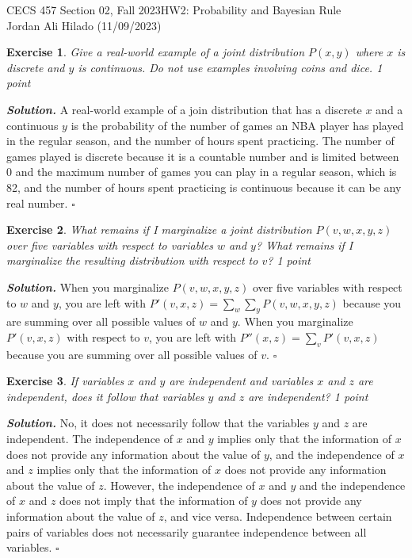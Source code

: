 \documentclass[12pt]{article}
\newtheorem{exercise}{Exercise}
\newenvironment{solution}[1][\it{Solution}]{\textbf{#1. } }{$\square$}
\begin{document}
\noindent CECS 457 Section 02, Fall 2023\hfill HW2: Probability and Bayesian Rule \\
Jordan Ali Hilado (11/09/2023)

\hrulefill

\begin{exercise}
Give a real-world example of a joint distribution $P(x, y)$ where $x$ is discrete and $y$ is continuous. Do not use examples involving coins and dice. 1 point
\end{exercise}
\begin{solution}
A real-world example of a join distribution that has a discrete $x$ and a continuous $y$ is the probability of the number of games an NBA player has played in the regular season, and the number of hours spent practicing. 
The number of games played is discrete because it is a countable number and is limited between 0 and the maximum number of games you can play in a regular season, which is 82, and the number of hours spent practicing is continuous because it can be any real number.
\end{solution} 

\begin{exercise}
What remains if I marginalize a joint distribution $P(v, w, x, y, z)$ over five variables with respect to variables $w$ and $y$? What remains if I marginalize the resulting distribution with respect to $v$? 1 point
\end{exercise}
\begin{solution}
When you marginalize $P(v, w, x, y, z)$ over five variables with respect to $w$ and $y$, you are left with $P'(v, x, z) = \sum_{w}\sum_{y}P(v, w, x, y, z)$ because you are summing over all possible values of $w$ and $y$. 
When you marginalize $P'(v, x, z)$ with respect to $v$, you are left with $P''(x, z) = \sum_{v}P'(v, x, z)$ because you are summing over all possible values of $v$.
\end{solution}

\begin{exercise}
If variables $x$ and $y$ are independent and variables $x$ and $z$ are independent, does it follow that variables $y$ and $z$ are independent? 1 point
\end{exercise}
\begin{solution}
No, it does not necessarily follow that the variables $y$ and $z$ are independent. 
The independence of $x$ and $y$ implies only that the information of $x$ does not provide any information about the value of $y$, and the independence of $x$ and $z$ implies only that the information of $x$ does not provide any information about the value of $z$. 
However, the independence of $x$ and $y$ and the independence of $x$ and $z$ does not imply that the information of $y$ does not provide any information about the value of $z$, and vice versa.
Independence between certain pairs of variables does not necessarily guarantee independence between all variables.
\end{solution}
\end{document}
